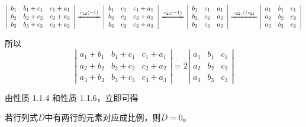 \begin{solution}
    $$\left|\begin{array}{cccc}
            b_{1} & b_{1}+c_{1} & c_{1}+a_{1} \\
            b_{2} & b_{2}+c_{2} & c_{2}+a_{2} \\
            b_{3} & b_{3}+c_{3} & c_{3}+a_{3}
        \end{array}\right|
        \xlongequal{c_{12}(-1)}\left|\begin{array}{cccc}
            b_{1} & c_{1} & c_{1}+a_{1} \\
            b_{2} & c_{2} & c_{2}+a_{2} \\
            b_{3} & c_{3} & c_{3}+a_{3}
        \end{array}\right|
        \xlongequal{c_{23}(-1)}\left|\begin{array}{cccc}
            b_{1} & c_{1} & a_{1} \\
            b_{2} & c_{2} & a_{2} \\
            b_{3} & c_{3} & a_{3}
        \end{array}\right|
        \xlongequal{\substack{c_{32}, //c_{21}}}\left|\begin{array}{cccc}
            a_{1} & b_{1} & c_{1} \\
            a_{2} & b_{2} & c_{2} \\
            a_{3} & b_{3} & c_{3}
        \end{array}\right|
    $$

    所以
    $$ \left|\begin{array}{cccc}
            a_{1}+b_{1} & b_{1}+c_{1} & c_{1}+a_{1} \\
            a_{2}+b_{2} & b_{2}+c_{2} & c_{2}+a_{2} \\
            a_{3}+b_{3} & b_{3}+c_{3} & c_{3}+a_{3}
        \end{array}\right|=2
        \left|\begin{array}{cccc}
            a_{1} & b_{1} & c_{1} \\
            a_{2} & b_{2} & c_{2} \\
            a_{3} & b_{3} & c_{3}
        \end{array}\right|
    $$

\end{solution}

由性质 1.1.4 和性质 1.1.6，立即可得
\begin{tuilun}
    若行列式$D$中有两行的元素对应成比例，则$D=0$。
\end{tuilun}

